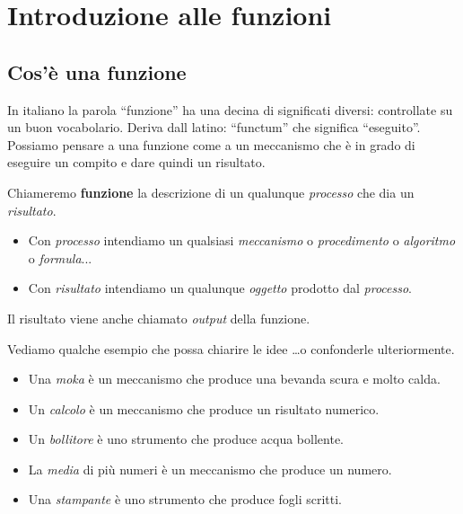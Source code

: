 


\chapter{Introduzione alle funzioni}

\section{Cos'è una funzione}
\label{sec:funzioni2_cose}

In italiano la parola  ``funzione'' ha una decina di significati diversi: 
controllate su un buon vocabolario. Deriva dall latino:  ``functum'' che 
significa  ``eseguito''.
Possiamo pensare a una funzione come a un meccanismo che è in grado di 
eseguire un compito e dare quindi un risultato.

\begin{definizione}
 Chiameremo \textbf{funzione} la descrizione di un qualunque 
 \emph{processo} che dia un \emph{risultato}.
\end{definizione}

\begin{itemize} [noitemsep]
 \item Con \emph{processo} intendiamo un qualsiasi \emph{meccanismo} o 
\emph{procedimento} o \emph{algoritmo} o \emph{formula}...
 \item Con \emph{risultato} intendiamo un qualunque \emph{oggetto} prodotto 
dal \emph{processo}.
\end{itemize}

Il risultato viene anche chiamato \emph{output} della funzione.
 
\begin{esempio}
Vediamo qualche esempio che possa chiarire le idee \dots o confonderle 
ulteriormente.
\begin{itemize} [noitemsep]
 \item Una \emph{moka} è un meccanismo che produce una bevanda scura e 
molto calda.
 \item Un \emph{calcolo} è un meccanismo che produce un risultato numerico.
 \item Un \emph{bollitore} è uno strumento che produce acqua bollente.
 \item La \emph{media}  di più numeri è un meccanismo che produce un numero.
 \item Una \emph{stampante} è uno strumento che produce fogli scritti.
\end{itemize}
\end{esempio}

